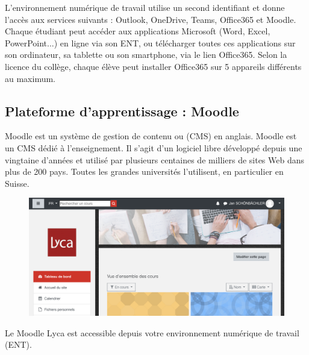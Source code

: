 \documentclass[10pt,a4paper]{report}
\begin{document}
L'environnement numérique de travail utilise un second identifiant et donne l'accès aux services suivants : Outlook, OneDrive, Teams, Office365 et Moodle. Chaque étudiant peut accéder aux applications Microsoft (Word, Excel, PowerPoint...) en ligne via son ENT, ou télécharger toutes ces applications sur son ordinateur, sa tablette ou son smartphone, via le lien Office365. Selon la licence du collège, chaque élève peut installer Office365 sur 5 appareils différents au maximum.







\subsection{Plateforme d'apprentissage : Moodle}

Moodle est un système de gestion de contenu ou  (CMS) en anglais. Moodle est un CMS dédié à l'enseignement. Il s'agit d'un logiciel libre développé depuis une vingtaine d'années et utilisé par plusieurs centaines de milliers de sites Web dans plus de 200 pays. Toutes les grandes universités l'utilisent, en particulier en Suisse.\\

\begin{figure}[H]
	\centering
	\includegraphics[width=.75\linewidth]{images/capture_moodle_lyca_2021}
	\caption{}
	\label{fig:capturemoodlelyca}
\end{figure}

Le Moodle Lyca est accessible depuis votre environnement numérique de travail (ENT).
\end{document}
